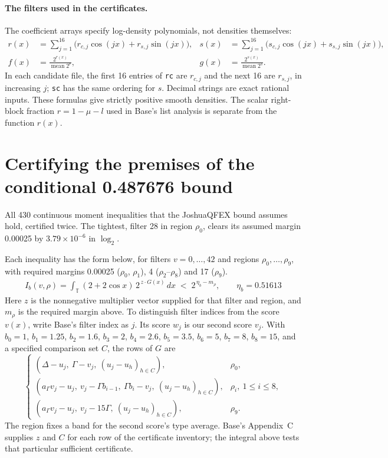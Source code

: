 \documentclass[11pt]{article}
\DeclareMathOperator{\mean}{mean}
\theoremstyle{plain}
\begin{document}
\paragraph{The filters used in the certificates.}
The coefficient arrays specify log-density polynomials, not densities themselves:
\begin{align*}
r(x)&=\sum_{j=1}^{16}\bigl(r_{c,j}\cos(jx)+r_{s,j}\sin(jx)\bigr),&
s(x)&=\sum_{j=1}^{16}\bigl(s_{c,j}\cos(jx)+s_{s,j}\sin(jx)\bigr),\\
f(x)&=\frac{2^{r(x)}}{\mean 2^r},&g(x)&=\frac{2^{s(x)}}{\mean 2^s}.
\end{align*}
In each candidate file, the first 16 entries of \texttt{rc} are $r_{c,j}$ and the next 16 are $r_{s,j}$, in increasing $j$; \texttt{sc} has the same ordering for $s$. Decimal strings are exact rational inputs. These formulas give strictly positive smooth densities. The scalar right-block fraction $r=1-\mu-l$ used in Base's list analysis is separate from the function $r(x)$.


\section{Certifying the premises of the conditional 0.487676 bound}

All 430 continuous moment inequalities that the JoshuaQFEX bound assumes hold, certified twice. The tightest, filter 28 in region $\rho_0$, clears its assumed margin 0.00025 by $3.79\times10^{-6}$ in $\log_2$.

Each inequality has the form below, for filters $v = 0,\dots,42$ and regions $\rho_0,\dots,\rho_9$, with required margins 0.00025 ($\rho_0$, $\rho_1$), 4 ($\rho_2$--$\rho_8$) and 17 ($\rho_9$).
\begin{gather*}
I_b(v,\rho) = \int_{\mathbb T} (2+2\cos x)\, 2^{\,z\cdot G(x)}\, dx \;<\; 2^{\,\eta_b - m_\rho}, \qquad \eta_b = 0.51613
\end{gather*}
Here $z$ is the nonnegative multiplier vector supplied for that filter and region, and $m_\rho$ is the required margin above. To distinguish filter indices from the score $v(x)$, write Base's filter index as $j$. Its score $w_j$ is our second score $v_j$. With $b_0=1$, $b_1=1.25$, $b_2=1.6$, $b_3=2$, $b_4=2.6$, $b_5=3.5$, $b_6=5$, $b_7=8$, $b_8=15$, and a specified comparison set $C$, the rows of $G$ are
\[
\begin{cases}
(\Delta-u_j,\ \Gamma-v_j,\ (u_j-u_h)_{h\in C}),&\rho_0,\\
(a_\Gamma v_j-u_j,\ v_j-\Gamma b_{i-1},\ \Gamma b_i-v_j,\ (u_j-u_h)_{h\in C}),&\rho_i,\ 1\le i\le8,\\
(a_\Gamma v_j-u_j,\ v_j-15\Gamma,\ (u_j-u_h)_{h\in C}),&\rho_9.
\end{cases}
\]
The region fixes a band for the second score's type average. Base's Appendix~C supplies $z$ and $C$ for each row of the certificate inventory; the integral above tests that particular sufficient certificate.
\end{document}

